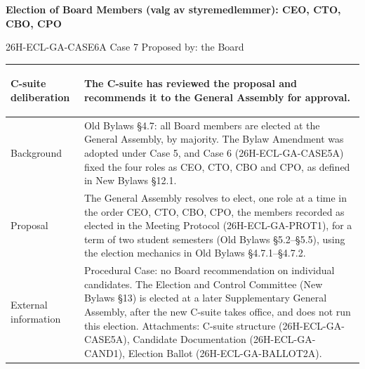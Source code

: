 \documentclass{../../../Common/Latex/Templates/rapport}
\begin{document}
\reportmainmatter
\small
\setlength{\parindent}{0pt}
\setlength{\tabcolsep}{6pt}
\renewcommand{\arraystretch}{1.2}

\begin{center}
  {\Large\bfseries Election of Board Members (valg av styremedlemmer): CEO, CTO, CBO, CPO}\par
  \vspace{0.15cm}
  {\normalsize 26H-ECL-GA-CASE6A \textperiodcentered{} Case 7 \textperiodcentered{} Proposed by: the Board}\par
  \vspace{0.1cm}
  {\small \meetingline}\par
\end{center}

\vspace{0.3cm}
\begin{tabularx}{\textwidth}{|>{\bfseries\raggedright\arraybackslash}p{4.2cm}|X|}
  \hline
  C-suite deliberation & The C-suite has reviewed the proposal and recommends it to the General Assembly for approval.                                                                                                                                                                                                                                                                                            \\
  \hline
  Background           & Old Bylaws \S4.7: all Board members are elected at the General Assembly, by majority. The Bylaw Amendment was adopted under Case 5, and Case 6 (26H-ECL-GA-CASE5A) fixed the four roles as CEO, CTO, CBO and CPO, as defined in New Bylaws \S12.1.                                                                                                                                       \\
  \hline
  Proposal             & The General Assembly resolves to elect, one role at a time in the order CEO, CTO, CBO, CPO, the members recorded as elected in the Meeting Protocol (26H-ECL-GA-PROT1), for a term of two student semesters (Old Bylaws \S5.2--\S5.5), using the election mechanics in Old Bylaws \S4.7.1--\S4.7.2.                                                                                      \\
  \hline
  External information & Procedural Case: no Board recommendation on individual candidates. The Election and Control Committee (New Bylaws \S13) is elected at a later Supplementary General Assembly, after the new C-suite takes office, and does not run this election. Attachments: C-suite structure (26H-ECL-GA-CASE5A), Candidate Documentation (26H-ECL-GA-CAND1), Election Ballot (26H-ECL-GA-BALLOT2A). \\
  \hline
\end{tabularx}
\end{document}
